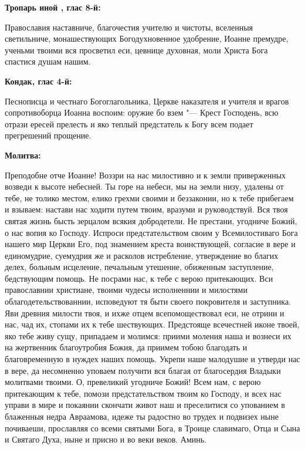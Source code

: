 \medskip


\bfseries Тропарь иной , глас 8-й:\normalfont{}\nopagebreak


Православия наставниче, благочестия учителю и чистоты, вселенныя светильниче, монашествующих Богодухновенное удобрение, Иоанне премудре, ученьми твоими вся просветил еси, цевнице духовная, моли Христа Бога спастися душам нашим.


\medskip


\bfseries Кондак, глас 4-й:\normalfont{}\nopagebreak


Песнописца и честнаго Богоглагольника, Церкве наказателя и учителя и врагов сопротивоборца Иоанна воспоим: оружие бо взем "--- Крест Господень, всю отрази ересей прелесть и яко теплый предстатель к Богу всем подает прегрешений прощение.


\medskip


\bfseries Молитва:\normalfont{}\nopagebreak


Преподобне отче Иоанне! Воззри на нас милостивно и к земли приверженных возведи к высоте небесней. Ты горе на небеси, мы на земли низу, удалены от тебе, не толико местом, елико грехми своими и беззаконии, но к тебе прибегаем и взываем: настави нас ходити путем твоим, вразуми и руководствуй. Вся твоя святая жизнь бысть зерцалом всякия добродетели. Не престани, угодниче Божий, о нас вопия ко Господу. Испроси предстательством своим у Всемилостиваго Бога нашего мир Церкви Его, под знамением креста воинствующей, согласие в вере и единомудрие, суемудрия же и расколов истребление, утверждение во благих делех, больным исцеление, печальным утешение, обиженным заступление, бедствующим помощь. Не посрами нас, к тебе с верою притекающих. Вси православнии христиане, твоими чудесы исполненнии и милостями облагодетельствованнии, исповедуют тя быти своего покровителя и заступника. Яви древния милости твоя, и ихже отцем всепомоществовал еси, не отрини и нас, чад их, стопами их к тебе шествующих. Предстояще всечестней иконе твоей, яко тебе живу сущу, припадаем и молимся: приими моления наша и вознеси их на жертвенник благоутробия Божия, да приимем тобою благодать и благовременную в нуждех наших помощь. Укрепи наше малодушие и утверди нас в вере, да несомненно уповаем получити вся благая от благосердия Владыки молитвами твоими. О, превеликий угодниче Божий! Всем нам, с верою притекающим к тебе, помози предстательством твоим ко Господу, и всех нас управи в мире и покаянии скончати живот наш и преселитися со упованием в блаженныя недра Авраамова, идеже ты радостно во трудех и подвизех ныне почиваеши, прославляя со всеми святыми Бога, в Троице славимаго, Отца и Сына и Святаго Духа, ныне и присно и во веки веков. Аминь.


